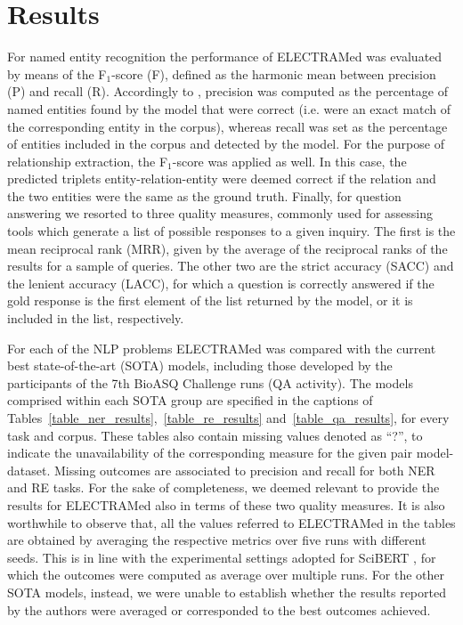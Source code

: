 \documentclass{article}
\begin{document}
\section{Results}
For named entity recognition the performance of ELECTRAMed was evaluated by means of the F$_1$-score (F), defined as the harmonic mean between precision (P) and recall (R).
Accordingly to \citep{Sang00}, precision was computed as the
percentage of named entities found by the model that were correct (i.e. were an exact match of the corresponding entity in the corpus), whereas recall was set as the percentage of entities included in the corpus and detected by the model.
For the purpose of relationship extraction, the F$_1$-score was applied as well.
In this case, the predicted triplets entity-relation-entity were deemed correct if the relation and the two entities were the same as the ground truth.
Finally, for question answering we resorted to three quality measures, commonly used for assessing tools which generate a list of possible responses to a given inquiry. 
The first is the mean reciprocal rank (MRR), given by the average of the reciprocal ranks of the results for a sample of queries.
The other two are the strict accuracy (SACC) and the lenient accuracy (LACC), for which a question is correctly answered if the gold response is the first element of the list returned by the model, or it is included in the list, respectively.

For each of the NLP problems ELECTRAMed was compared with the current best state-of-the-art (SOTA) models, including those developed by the participants of the 7th BioASQ Challenge runs (QA activity).
The models comprised within each SOTA group are specified in the captions of Tables~\ref{table_ner_results},~\ref{table_re_results} and~\ref{table_qa_results}, for every task and corpus.
These tables also contain missing values denoted as ``?'', to indicate the unavailability of the corresponding measure for the given pair model-dataset.
Missing outcomes are associated to precision and recall for both NER and RE tasks.
For the sake of completeness, we deemed relevant to provide the results for ELECTRAMed also in terms of these two quality measures.
It is also worthwhile to observe that, all the values referred to ELECTRAMed in the tables are obtained by averaging the respective metrics over five runs with different seeds.
This is in line with the experimental settings adopted for SciBERT \citep{Beltagy19}, for which the outcomes were computed as average over multiple runs. 
For the other SOTA models, instead, we were unable to establish whether the results reported by the authors were averaged or corresponded to the best outcomes achieved.
\end{document}
